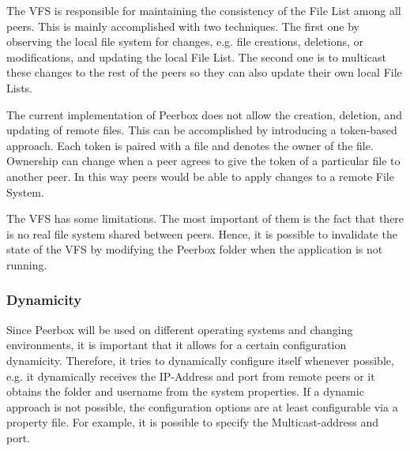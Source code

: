 The VFS is responsible for maintaining the consistency of the File List among all peers. This is mainly accomplished with two techniques. The first one by observing the local file system for changes, e.g. file creations, deletions, or modifications, and updating the local File List. The second one is to multicast these changes to the rest of the peers so they can also update their own local File Lists.

The current implementation of Peerbox does not allow the creation, deletion, and updating of remote files. This can be accomplished by introducing a token-based approach. Each token is paired with a file and denotes the owner of the file. Ownership can change when a peer agrees to give the token of a particular file to another peer. In this way peers would be able to apply changes to a remote File System.

The VFS has some limitations. The most important of them is the fact that there is no real file system shared between peers. Hence, it is possible to invalidate the state of the VFS by modifying the Peerbox folder when the application is not running.

\subsubsection{Dynamicity}
Since Peerbox will be used on different operating systems and changing environments, it is important that it allows for a certain configuration dynamicity. Therefore, it tries to dynamically configure itself whenever possible, e.g. it dynamically receives the IP-Address and port from remote peers or it obtains the folder and username from the system properties. If a dynamic approach is not possible, the configuration options are at least configurable via a property file. 
For example, it is possible to specify the Multicast-address and port.

